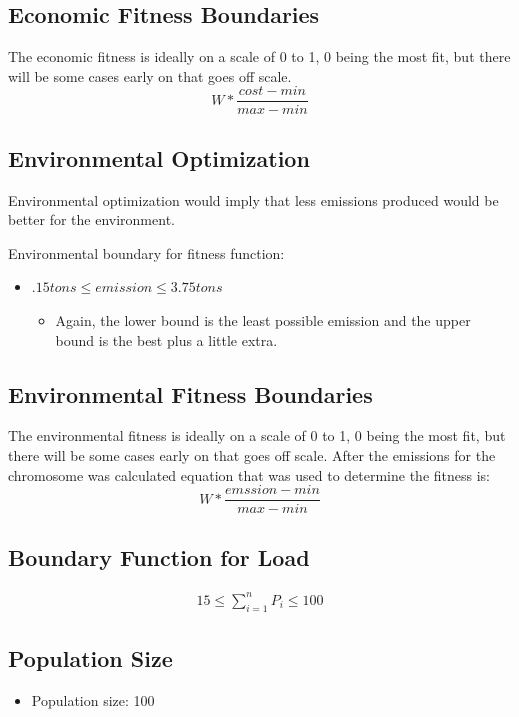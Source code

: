 \documentclass{article}
\begin{document}
    \subsection{Economic Fitness Boundaries}
    The economic fitness is ideally on a scale of 0 to 1, 0 being the most fit, but there will be some cases early on that goes off scale.
    \[W*\frac{cost-min}{max-min}\]
    
    \subsection{Environmental Optimization}
    Environmental optimization would imply that less emissions produced would be better for the environment.

    Environmental boundary for fitness function:
    \begin{itemize}
        \item \(.15  tons \leq emission \leq 3.75  tons\)
        \begin{itemize}
            \item Again, the lower bound is the least possible emission and the upper bound is the best plus a little extra.
        \end{itemize}
    \end{itemize}

    \subsection{Environmental Fitness Boundaries}
    The environmental fitness is ideally on a scale of 0 to 1, 0 being the most fit, but there will be some cases early on that goes off scale.
    After the emissions for the chromosome was calculated equation that was used to determine the fitness is:
    \[W*\frac{emssion-min}{max-min}\]

    \subsection{Boundary Function for Load}
        \begin{align*}
            15 \leq \sum_{i=1}^{n} P_i \leq 100
        \end{align*}

    \subsection{Population Size}
    \begin{itemize}
        \item Population size: 100    
    \end{itemize}
\end{document}
